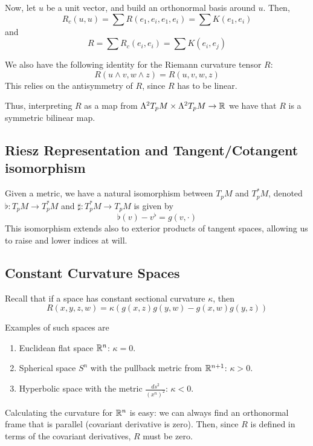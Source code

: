 \documentclass[../main.tex]{subfiles}
\begin{document}
Now, let $u$ be a unit vector, and build an orthonormal basis around $u$. Then,
\[
    R_c(u,u) = \sum R(e_1,e_i,e_1,e_i) = \sum K(e_1,e_i)
\]
and
\[
    R = \sum R_c(e_i,e_i) = \sum K(e_i,e_j)
\]


We also have the following identity for the Riemann curvature tensor $R$:
\begin{equation}
    R(u\wedge v, w\wedge z) = R(u,v,w,z)
\end{equation}
This relies on the antisymmetry of $R$, since $R$ has to be linear.

Thus, interpreting $R$ as a map from $\Lambda^2T_pM\times\Lambda^2T_pM\to\mathbb{R}$ we
have that $R$ is a symmetric bilinear map.

\subsection{Riesz Representation and Tangent/Cotangent isomorphism}
Given a metric, we have a natural isomorphism between $T_pM$ and $T^*_pM$,
denoted $\flat: T_pM\to T^*_pM$ and $\sharp:T^*_pM\to T_pM$ is given by
\begin{equation}
    \flat(v) - v^{\flat} = g(v,\cdot)
\end{equation}
This isomorphism extends also to exterior products of tangent spaces, allowing
us to raise and lower indices at will.

\subsection{Constant Curvature Spaces}
Recall that if a space has constant sectional curvature $\kappa$, then
\begin{equation}
    R(x,y,z,w) = \kappa(g(x,z)g(y,w) - g(x,w)g(y,z))
\end{equation}

Examples of such spaces are
\begin{enumerate}
    \item Euclidean flat space $\mathbb{R}^n$: $\kappa=0$.
    \item Spherical space $S^n$ with the pullback metric from $\mathbb{R}^{n+1}$: 
        $\kappa>0$.
    \item Hyperbolic space with the metric $\frac{ds^2}{(x^n)^2}$: $\kappa<0$.
\end{enumerate}

Calculating the curvature for $\mathbb{R}^n$ is easy: we can always find an orthonormal
frame that is parallel (covariant derivative is zero). Then, since $R$ is
defined in terms of the covariant derivatives, $R$ must be zero.
\end{document}
